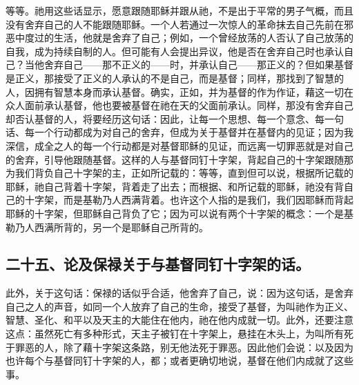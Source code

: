 等等。祂用这些话显示，愿意跟随耶稣并跟从祂，不是出于平常的男子气概，而且没有舍弃自己的人不能跟随耶稣。一个人若通过一次惊人的革命抹去自己先前在邪恶中度过的生活，他就是舍弃了自己；例如，一个曾经放荡的人否认了自己放荡的自我，成为持续自制的人。但可能有人会提出异议，他是否在舍弃自己时也承认自己？当他舍弃自己——那不正义的——时，并承认自己——那正义的？但如果基督是正义，那接受了正义的人承认的不是自己，而是基督；同样，那找到了智慧的人，因拥有智慧本身而承认基督。确实，正如，并为基督的作为作证，藉这一切在众人面前承认基督，他也要被基督在祂在天的父面前承认。同样，那没有舍弃自己却否认基督的人，将要经历这句话：因此，让每一个思想、每一个意念、每一句话、每一个行动都成为对自己的舍弃，但成为关于基督并在基督内的见证；因为我深信，成全之人的每一个行动都是对基督耶稣的见证，而远离一切罪恶就是对自己的舍弃，引导他跟随基督。这样的人与基督同钉十字架，背起自己的十字架跟随那为我们背负自己十字架的主，正如所记载的：等等，直到但可以说，根据所记载的耶稣，祂自己背着十字架，背着走了出去；而根据、和所记载的耶稣，祂没有背自己的十字架，而是基勒乃人西满背着。也许这个人指的是我们，我们因耶稣而背起耶稣的十字架，但耶稣自己背负了它；因为可以说有两个十字架的概念：一个是基勒乃人西满所背的，另一个是耶稣自己所背的。\par


\subsection{二十五、论及保禄关于与基督同钉十字架的话。}

此外，关于这句话：保禄的话似乎合适，他舍弃了自己，说：因为这句话，是舍弃自己之人的声音，如同一个人放弃了自己的生命，接受了基督，为叫祂作为正义、智慧、圣化、和平以及天主的大能住在他内，祂在他内成就一切。此外，还要注意这点：虽然死亡有多种形式，天主子被钉在十字架上，悬挂在木头上，为叫所有死于罪恶的人，除了藉十字架这条路，别无他法死于罪恶。因此他们会说：以及因为也许每个与基督同钉十字架的人，都；或者更确切地说，基督在他们内成就了这些事。\par

